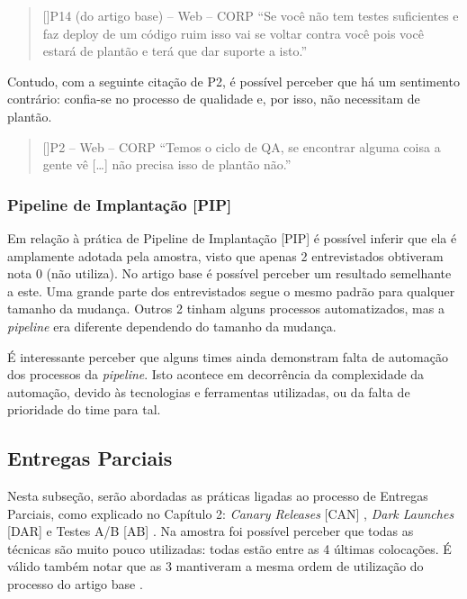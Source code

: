 \begin{quotation}[]{P14 (do artigo base) -- Web -- CORP}
    ``Se você não tem testes suficientes e faz deploy de um código ruim isso vai se voltar contra você pois você estará de plantão e terá que dar suporte a isto.''
\end{quotation}

Contudo, com a seguinte citação de P2, é possível perceber que há um sentimento contrário: confia-se no processo de qualidade e, por isso, não necessitam de plantão.

\vspace{5mm}

\begin{quotation}[]{P2 -- Web -- CORP}
    ``Temos o ciclo de QA, se encontrar alguma coisa a gente vê […] não precisa isso de plantão não.''
\end{quotation}

\subsubsection{Pipeline de Implantação [PIP]}

Em relação à prática de Pipeline de Implantação [PIP] é possível inferir que ela é amplamente adotada pela amostra, visto que apenas 2 entrevistados obtiveram nota 0 (não utiliza). No artigo base é possível perceber um resultado semelhante a este. Uma grande parte dos entrevistados segue o mesmo padrão para qualquer tamanho da mudança. Outros 2 tinham alguns processos automatizados, mas a \emph{pipeline} era diferente dependendo do tamanho da mudança.

É interessante perceber que alguns times ainda demonstram falta de automação dos processos da \emph{pipeline}. Isto acontece em decorrência da complexidade da automação, devido às tecnologias e ferramentas utilizadas, ou da falta de prioridade do time para tal.
 
\subsection{Entregas Parciais}

Nesta subseção, serão abordadas as práticas ligadas ao processo de Entregas Parciais, como explicado no Capítulo 2: \emph{Canary Releases} [CAN] \cite{continuousDeliveryBook}, \emph{Dark Launches} [DAR] \cite{devAndDeploymentFB} e Testes A/B [AB] \cite{testsAB}. Na amostra foi possível perceber que todas as técnicas são muito pouco utilizadas: todas estão entre as 4 últimas colocações. É válido também notar que as 3 mantiveram a mesma ordem de utilização do processo do artigo base \cite{empiricalStudy2016}.

